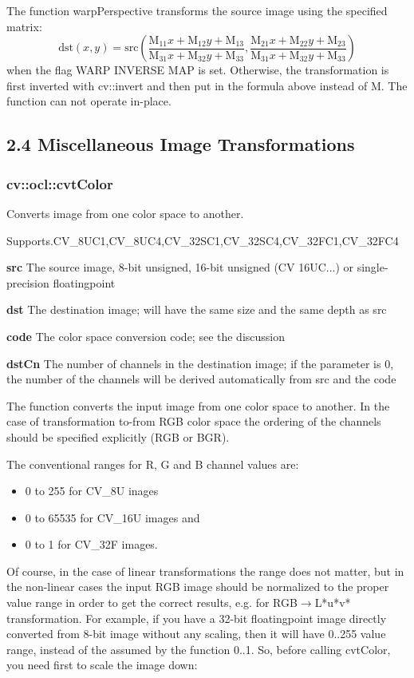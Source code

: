 \documentclass{article}
\begin{document}
The function warpPerspective transforms the source image using the specified
matrix:
\[
\mbox{dst}(x,y)=\mbox{src}(\frac{\mbox{M}_{11} x+\mbox{M}_{12}
y+\mbox{M}_{13} }{\mbox{M}_{31} x+\mbox{M}_{32} y+\mbox{M}_{33}
},\frac{\mbox{M}_{21} x+\mbox{M}_{22} y+\mbox{M}_{23} }{\mbox{M}_{31}
x+\mbox{M}_{32} y+\mbox{M}_{33} })
\]
when the flag WARP INVERSE MAP is set. Otherwise, the transformation is
first inverted with cv::invert and then put in the formula above instead of
M. The function can not operate in-place.

\newpage

\subsection{2.4 Miscellaneous Image Transformations}
\label{subsec:mylabel6}
\subsubsection{cv::ocl::cvtColor}
\label{subsubsec:mylabel48}
Converts image from one color space to another.

Supports.CV{\_}8UC1,CV{\_}8UC4,CV{\_}32SC1,CV{\_}32SC4,CV{\_}32FC1,CV{\_}32FC4

\textbf{src }The source image, 8-bit unsigned, 16-bit unsigned (CV 16UC...)
or single-precision floatingpoint

\textbf{dst }The destination image; will have the same size and the same
depth as src

\textbf{code }The color space conversion code; see the discussion

\textbf{dstCn }The number of channels in the destination image; if the
parameter is 0, the number of the channels will be derived automatically
from src and the code

The function converts the input image from one color space to another. In
the case of transformation to-from RGB color space the ordering of the
channels should be specified explicitly (RGB or BGR).

The conventional ranges for R, G and B channel values are:

\begin{itemize}
\item 0 to 255 for CV{\_}8U inages
\item 0 to 65535 for CV{\_}16U images and
\item 0 to 1 for CV{\_}32F images.
\end{itemize}

Of course, in the case of linear transformations the range does not matter,
but in the non-linear cases the input RGB image should be normalized to the
proper value range in order to get the correct results, e.g. for RGB$\to
$L*u*v* transformation. For example, if you have a 32-bit floatingpoint
image directly converted from 8-bit image without any scaling, then it will
have 0..255 value range, instead of the assumed by the function 0..1. So,
before calling cvtColor, you need first to scale the image down:
\end{document}
